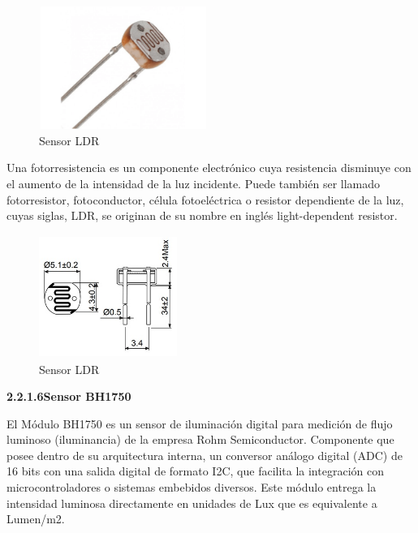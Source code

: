 \begin{figure}[H]
      \centering
      \includegraphics[width=5.5cm, height=4cm]{imagenes/sensor LDR.png}
      \caption{Sensor LDR}
      \label{imag:LDR}
   \end{figure}

Una fotorresistencia es un componente electrónico cuya resistencia disminuye con el aumento de la intensidad de la luz incidente. Puede también ser llamado fotorresistor, fotoconductor, célula fotoeléctrica o resistor dependiente de la luz, cuyas siglas, LDR, se originan de su nombre en inglés light-dependent resistor.\\

\begin{figure}[H]
    \centering
    \includegraphics[width=4.5cm, height=4cm]{imagenes/ldr.jpg}
    \caption{Sensor LDR}
    \label{imag:dimensiones LDR}
 \end{figure}

\vspace{0.5cm}

        \textbf{2.2.1.6\hspace{5mm}Sensor BH1750}\newline

El Módulo BH1750 es un sensor de iluminación digital para medición de flujo luminoso (iluminancia) de la empresa Rohm Semiconductor. Componente que posee dentro de su arquitectura interna, un conversor análogo digital (ADC) de 16 bits con una salida digital de formato I2C, que facilita la integración con microcontroladores o sistemas embebidos diversos. Este módulo entrega la intensidad luminosa directamente en unidades de Lux que es equivalente a Lumen/m2.\\

